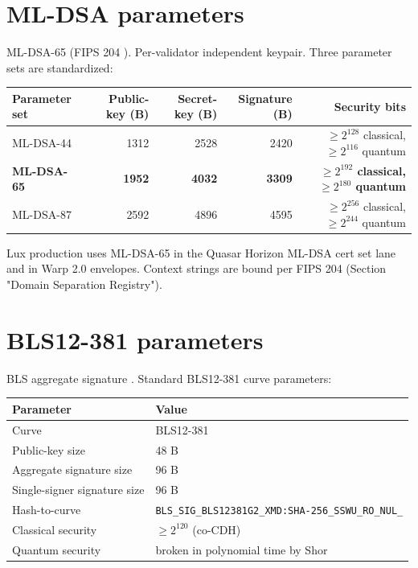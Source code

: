 \documentclass[11pt,a4paper]{article}
\begin{document}
\section{ML-DSA parameters}

ML-DSA-65 (FIPS 204 \cite{fips204}). Per-validator independent keypair. Three parameter sets are standardized:

\begin{tabular}{@{}lrrrr@{}}
  \toprule
  \textbf{Parameter set} & \textbf{Public-key (B)} & \textbf{Secret-key (B)} & \textbf{Signature (B)} & \textbf{Security bits} \\
  \midrule
  ML-DSA-44 & 1312 & 2528 & 2420 & $\geq 2^{128}$ classical, $\geq 2^{116}$ quantum \\
  \textbf{ML-DSA-65} & \textbf{1952} & \textbf{4032} & \textbf{3309} & \textbf{$\geq 2^{192}$ classical, $\geq 2^{180}$ quantum} \\
  ML-DSA-87 & 2592 & 4896 & 4595 & $\geq 2^{256}$ classical, $\geq 2^{244}$ quantum \\
  \bottomrule
\end{tabular}

Lux production uses ML-DSA-65 in the Quasar Horizon ML-DSA cert set lane and in Warp 2.0 envelopes. Context strings are bound per FIPS 204 (Section "Domain Separation Registry").

\section{BLS12-381 parameters}

BLS aggregate signature \cite{lp075}. Standard BLS12-381 curve parameters:

\begin{tabular}{@{}p{}p{}@{}}
  \toprule
  \textbf{Parameter} & \textbf{Value} \\
  \midrule
  Curve & BLS12-381 \\
  Public-key size & 48 B \\
  Aggregate signature size & 96 B \\
  Single-signer signature size & 96 B \\
  Hash-to-curve & \texttt{BLS\_SIG\_BLS12381G2\_XMD:SHA-256\_SSWU\_RO\_NUL\_} \\
  Classical security & $\geq 2^{120}$ (co-CDH) \\
  Quantum security & broken in polynomial time by Shor \\
  \bottomrule
\end{tabular}
\end{document}
